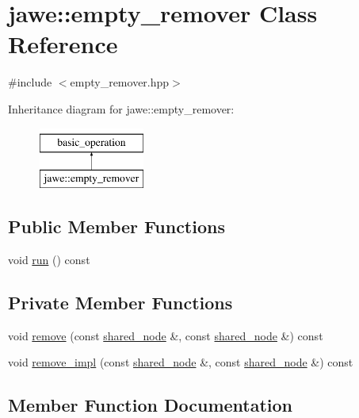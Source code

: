 \hypertarget{classjawe_1_1empty__remover}{}\section{jawe\+:\+:empty\+\_\+remover Class Reference}
\label{classjawe_1_1empty__remover}


{\ttfamily \#include $<$empty\+\_\+remover.\+hpp$>$}

Inheritance diagram for jawe\+:\+:empty\+\_\+remover\+:\begin{figure}[H]
\begin{center}
\leavevmode
\includegraphics[height=2.000000cm]{classjawe_1_1empty__remover}
\end{center}
\end{figure}
\subsection*{Public Member Functions}
\begin{DoxyCompactItemize}
\item 
void \hyperlink{classjawe_1_1empty__remover_af369f9e6202276fc09d8b21271916c7e}{run} () const
\end{DoxyCompactItemize}
\subsection*{Private Member Functions}
\begin{DoxyCompactItemize}
\item 
void \hyperlink{classjawe_1_1empty__remover_aa2e19828a73d38052e21dc5a58826916}{remove} (const \hyperlink{namespacejawe_a3f307481d921b6cbb50cc8511fc2b544}{shared\+\_\+node} \&, const \hyperlink{namespacejawe_a3f307481d921b6cbb50cc8511fc2b544}{shared\+\_\+node} \&) const
\item 
void \hyperlink{classjawe_1_1empty__remover_a4e97d479ce5a67b38fe904b7ab017f94}{remove\+\_\+impl} (const \hyperlink{namespacejawe_a3f307481d921b6cbb50cc8511fc2b544}{shared\+\_\+node} \&, const \hyperlink{namespacejawe_a3f307481d921b6cbb50cc8511fc2b544}{shared\+\_\+node} \&) const
\end{DoxyCompactItemize}


\subsection{Member Function Documentation}
\mbox{\label{classjawe_1_1empty__remover_aa2e19828a73d38052e21dc5a58826916}} 
